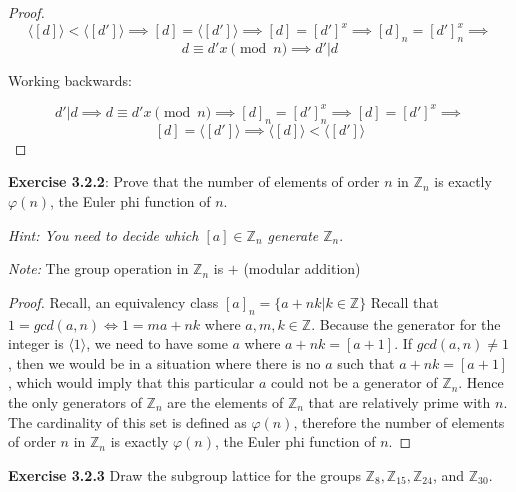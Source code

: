 \documentclass[a4paper]{article}
\begin{document}
\begin{myparindent}{0pt}
\begin{proof}
\[ \langle [d] \rangle < \langle [d'] \rangle \implies [d] = \langle [d'] \rangle \implies [d] = [d']^x \implies [d]_n = [d']_n^x \implies \]
\[ d \equiv d'x \pmod n \implies d' | d \]

Working backwards:

\[ d' | d \implies d \equiv d'x \pmod n \implies [d]_n = [d']_n^x \implies [d] = [d']^x \implies \]
\[ [d] = \langle [d'] \rangle \implies \langle [d] \rangle < \langle [d'] \rangle \]
\end{proof}

\textbf{Exercise 3.2.2}:
Prove that the number of elements of order $n$ in $\mathbb{Z}_n$ is exactly
$\varphi(n)$, the Euler phi function of $n$.

\textit{Hint: You need to decide which $[a] \in \mathbb{Z}_n$ generate $\mathbb{Z}_n$}.
\newline

\textit{Note:} The group operation in $\mathbb{Z}_n$ is $+$ (modular addition)
\newline

\begin{proof}
  Recall, an equivalency class $[a]_n = \{ a + nk | k \in \mathbb{Z} \}$
  Recall that $1 = gcd(a, n) \iff 1 = ma + nk$ where $a, m, k \in \mathbb{Z}$.
  Because the generator for the integer is $\langle 1 \rangle$, we need to have
  some $a$ where $a + nk = [a + 1]$. If $gcd(a, n) \neq 1$, then we would be in
  a situation where there is no $a$ such that $a + nk = [a + 1]$, which would
  imply that this particular $a$ could not be a generator of $\mathbb{Z}_n$.
  Hence the only generators of $\mathbb{Z}_n$ are the elements of $\mathbb{Z}_n$
  that are relatively prime with $n$. The cardinality of this set is defined as
  $\varphi(n)$, therefore the number of elements of order $n$ in $\mathbb{Z}_n$
  is exactly $\varphi(n)$, the Euler phi function of $n$.
\end{proof}

\textbf{Exercise 3.2.3}
Draw the subgroup lattice for the groups
$\mathbb{Z}_8, \mathbb{Z}_{15}, \mathbb{Z}_{24}$, and $\mathbb{Z}_{30}$.
\newline


\end{myparindent}
\end{document}

